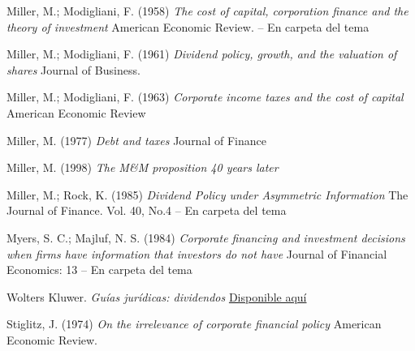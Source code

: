 \documentclass{nuevotema}
\begin{document}
Miller, M.; Modigliani, F. (1958) \textit{The cost of capital, corporation finance and the theory of investment} American Economic Review. -- En carpeta del tema

Miller, M.; Modigliani, F. (1961) \textit{Dividend policy, growth, and the valuation of shares}  Journal of Business.

Miller, M.; Modigliani, F. (1963) \textit{Corporate income taxes and the cost of capital}  American Economic Review

Miller, M. (1977) \textit{Debt and taxes} Journal of Finance

Miller, M. (1998) \textit{The M\&M proposition 40 years later} 

Miller, M.; Rock, K. (1985) \textit{Dividend Policy under Asymmetric Information} The Journal of Finance. Vol. 40, No.4 -- En carpeta del tema

Myers, S. C.; Majluf, N. S. (1984) \textit{Corporate financing and investment decisions when firms have information that investors do not have} Journal of Financial Economics: 13 -- En carpeta del tema

Wolters Kluwer. \textit{Guías jurídicas: dividendos} \href{https://guiasjuridicas.wolterskluwer.es/Content/Documento.aspx?params=H4sIAAAAAAAEAMtMSbF1jTAAAUMTM2MztbLUouLM_DxbIwMDCwNzA0uQQGZapUt-ckhlQaptWmJOcSoA9wD6lDUAAAA=WKE}{Disponible aquí}

Stiglitz, J. (1974) \textit{On the irrelevance of corporate financial policy}  American Economic Review.
\end{document}

